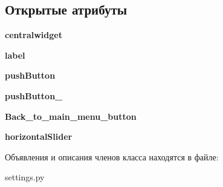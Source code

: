 \subsection*{Открытые атрибуты}
\begin{DoxyCompactItemize}
\item 
\mbox{\label{classsettings_1_1_ui___main_window_ac7aa5890bf6fbde2cfd2e52a581ffd4b}} 
{\bfseries centralwidget}
\item 
\mbox{\label{classsettings_1_1_ui___main_window_aea8e9829d03108f98e89d15dd72d2006}} 
{\bfseries label}
\item 
\mbox{\label{classsettings_1_1_ui___main_window_a54f9774ec6c946edf312b2029d95a7a8}} 
{\bfseries push\+Button}
\item 
\mbox{\label{classsettings_1_1_ui___main_window_a3df87b065c6a647f30dffb39af123a9e}} 
{\bfseries push\+Button\+\_}
\item 
\mbox{\label{classsettings_1_1_ui___main_window_a55fb0e2423e2d6d3e0723c729d8bae1d}} 
{\bfseries Back\+\_\+to\+\_\+main\+\_\+menu\+\_\+button}
\item 
\mbox{\label{classsettings_1_1_ui___main_window_a688d6231fa94dac0620b71c021108aff}} 
{\bfseries horizontal\+Slider}
\end{DoxyCompactItemize}


Объявления и описания членов класса находятся в файле\+:\begin{DoxyCompactItemize}
\item 
settings.\+py\end{DoxyCompactItemize}
